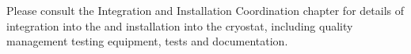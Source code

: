 Please consult the Integration and Installation Coordination chapter for details of  integration into the  and installation into the cryostat, including quality management testing equipment, tests and documentation. 


    






